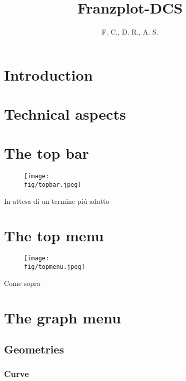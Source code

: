 \documentclass{article}
\title{Franzplot-DCS}
\author{F. C., D. R., A. S.}
\newcommand{\fig}{figures} %
\begin{document}
\maketitle
\tableofcontents
\newpage
\section{Introduction}\label{s:intro}
\section{Technical aspects}\label{s:tech_asp}
\section{The top bar}\label{s:top_bar}


\begin{figure}
\texttt{[image: \\fig/topbar.jpeg]}
\caption{\label{fig:topbar}}
\end{figure}
In attesa di un termine pi\'u adatto
\section{The top menu}\label{s:top_menu}
\begin{figure}
\texttt{[image: \\fig/topmenu.jpeg]}
\caption{\label{fig:topmenu}}
\end{figure}
Come sopra
\section{The graph menu}\label{s:graph_menu}
\subsection{Geometries}\label{ss:geometries}
\subsubsection{Curve}\label{sss:curve}
\end{document}
